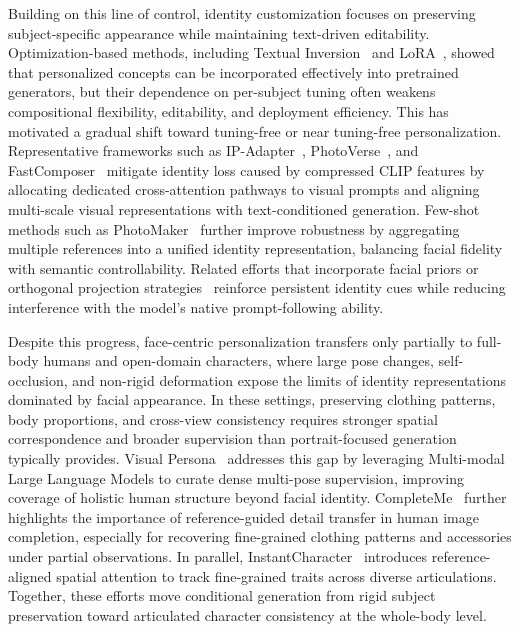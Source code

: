 \documentclass{llmxive}
\begin{document}
Building on this line of control, identity customization focuses on preserving subject-specific appearance while maintaining text-driven editability. Optimization-based methods, including Textual Inversion~\citep{gal2022image} and LoRA~\citep{hu2022lora}, showed that personalized concepts can be incorporated effectively into pretrained generators, but their dependence on per-subject tuning often weakens compositional flexibility, editability, and deployment efficiency. This has motivated a gradual shift toward tuning-free or near tuning-free personalization. Representative frameworks such as IP-Adapter~\citep{ye2023ip}, PhotoVerse~\citep{chen2023photoverse}, and FastComposer~\citep{xiao2025fastcomposer} mitigate identity loss caused by compressed CLIP features by allocating dedicated cross-attention pathways to visual prompts and aligning multi-scale visual representations with text-conditioned generation. Few-shot methods such as PhotoMaker~\citep{li2024photomaker} further improve robustness by aggregating multiple references into a unified identity representation, balancing facial fidelity with semantic controllability. Related efforts that incorporate facial priors or orthogonal projection strategies~\citep{wang2024instantid, guo2024pulid, shi2024instantbooth, zhou2024storymaker, mou2025dreamo} reinforce persistent identity cues while reducing interference with the model's native prompt-following ability.



Despite this progress, face-centric personalization transfers only partially to full-body humans and open-domain characters, where large pose changes, self-occlusion, and non-rigid deformation expose the limits of identity representations dominated by facial appearance. In these settings, preserving clothing patterns, body proportions, and cross-view consistency requires stronger spatial correspondence and broader supervision than portrait-focused generation typically provides. Visual Persona~\citep{nam2025visual} addresses this gap by leveraging Multi-modal Large Language Models to curate dense multi-pose supervision, improving coverage of holistic human structure beyond facial identity. CompleteMe~\citep{tsai2025completeme} further highlights the importance of reference-guided detail transfer in human image completion, especially for recovering fine-grained clothing patterns and accessories under partial observations. In parallel, InstantCharacter~\citep{InstantCharacter} introduces reference-aligned spatial attention to track fine-grained traits across diverse articulations. Together, these efforts move conditional generation from rigid subject preservation toward articulated character consistency at the whole-body level.
\end{document}
